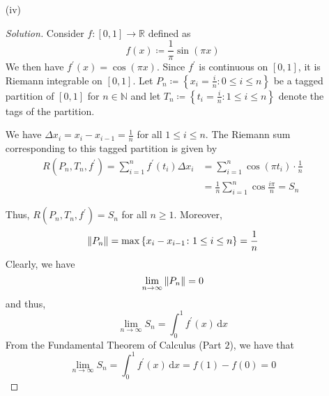 \documentclass[12pt]{article}
\def\D{\mathrm{d}}
\theoremstyle{definition}
\newenvironment{soln}{\begin{proof}[Solution]}{\end{proof}}
\begin{document}
\begin{enumerate}[leftmargin=*]
\begin{enumerate}[leftmargin=*]
\begin{soln}
        Thus, $R(P_n, T_n, f^{\prime}) = S_n$ for all $n \geq 1$. Moreover, 
        \[
            \norm{P_n} = \max \left\{ x_i - x_{i-1} \colon 1 \leq i \leq n \right\} = \frac{1}{n}
        \]
        Clearly, we have
        \[
            \lim_{n \to \infty} \norm{P_n} = 0
        \]
        and thus,
        \[
            \lim_{n \to \infty} S_n = \int_0^1 f^{\prime}(x) \, \D x
        \]
        From the Fundamental Theorem of Calculus (Part $2$), we have that
        \[
            \lim_{n \to \infty} S_n = \int_0^1 f^{\prime}(x) \, \D x = f(1) - f(0) = \boxed{\frac{\pi}{4}}
        \]
        \end{soln}
        
        \item[(iv)] 
        \begin{soln}
    
        Consider $f : [0,1] \rightarrow \mathbb{R}$ defined as 
        \[
            f(x) \coloneqq \frac{1}{\pi} \sin(\pi x) 
        \]
        We then have $f^{\prime}(x) = \cos(\pi x)$. Since $f^{\prime}$ is continuous on $[0,1]$, it is Riemann integrable on $[0,1]$. Let $P_n \coloneqq \left\{ x_i = \frac{i}{n} \colon 0 \leq i \leq n \right\}$ be a tagged partition of $[0,1]$ for $n \in \mathbb{N}$ and let $T_n \coloneqq \left\{ t_i = \frac{i}{n} \colon 1 \leq i \leq n\right\}$ denote the tags of the partition. 
        
        \medskip
        
        We have $\Delta x_i = x_{i} - x_{i-1} = \frac{1}{n}$ for all $1 \leq i \leq n$. The Riemann sum corresponding to this tagged partition is given by 
        \begin{align*}
            R(P_n, T_n, f^{\prime}) = \sum_{i=1}^{n} f^{\prime}(t_i) \Delta x_i &= \sum_{i=1}^n \cos(\pi t_i) \cdot \frac{1}{n} \\
            &= \frac{1}{n} \sum\limits_{i=1}^n \cos \frac{i\pi}{n} = S_n
        \end{align*}
        
        Thus, $R(P_n, T_n, f^{\prime}) = S_n$ for all $n \geq 1$. Moreover, 
        \[
            \norm{P_n} = \max \left\{ x_i - x_{i-1} \colon 1 \leq i \leq n \right\} = \frac{1}{n}
        \]
        Clearly, we have
        \[
            \lim_{n \to \infty} \norm{P_n} = 0
        \]
        and thus,
        \[
            \lim_{n \to \infty} S_n = \int_0^1 f^{\prime}(x) \, \D x
        \]
        From the Fundamental Theorem of Calculus (Part $2$), we have that
        \[
            \lim_{n \to \infty} S_n = \int_0^1 f^{\prime}(x) \, \D x = f(1) - f(0) = \boxed{0}
        \]
        \end{soln}
    \end{enumerate}
    

\end{enumerate}
\end{document}
